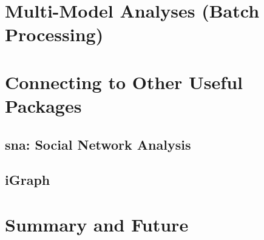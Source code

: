 \documentclass[12pt]{article}
\begin{document}
\section{Multi-Model Analyses (Batch Processing)}

\section{Connecting to Other Useful Packages}

\subsection{sna: Social Network Analysis}

\subsection{iGraph}

\section{Summary and Future}
\end{document}

